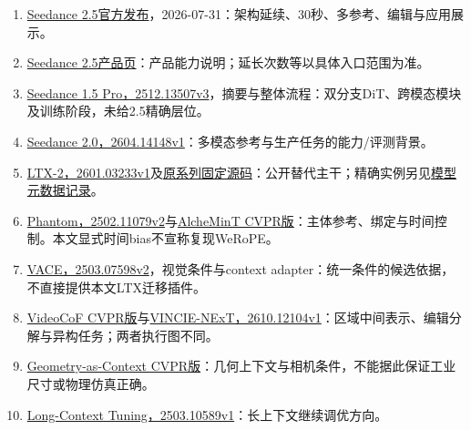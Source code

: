\begin{enumerate}
\def\labelenumi{\arabic{enumi}.}
\tightlist
\item
  \href{https://seed.bytedance.com/blog/one-take-creation-flexible-referencing-introducing-seedance-2-5}{Seedance 2.5官方发布}，2026-07-31：架构延续、30秒、多参考、编辑与应用展示。
\item
  \href{https://seed.bytedance.com/en/seedance2_5}{Seedance 2.5产品页}：产品能力说明；延长次数等以具体入口范围为准。
\item
  \href{https://arxiv.org/abs/2512.13507v3}{Seedance 1.5 Pro，2512.13507v3}，摘要与整体流程：双分支DiT、跨模态模块及训练阶段，未给2.5精确层位。
\item
  \href{https://arxiv.org/abs/2604.14148v1}{Seedance 2.0，2604.14148v1}：多模态参考与生产任务的能力/评测背景。
\item
  \href{https://arxiv.org/abs/2601.03233v1}{LTX-2，2601.03233v1}及\href{https://github.com/Lightricks/LTX-2/tree/bd92a5f408eb8c99f8c05e9fe2fcaaec8b56b638}{原系列固定源码}：公开替代主干；精确实例另见\href{https://github.com/foocker/multimodal-journey/blob/0f1b6bb86d609d75d8c2582063d85707d0180d39/research/2026-11-22-implementation-contracts/model-config-check.json}{模型元数据记录}。
\item
  \href{https://arxiv.org/abs/2502.11079v2}{Phantom，2502.11079v2}与\href{https://openaccess.thecvf.com/content/CVPR2026/html/Girish_AlcheMinT_Fine-grained_Temporal_Control_for_Multi-Reference_Consistent_Video_Generation_CVPR_2026_paper.html}{AlcheMinT CVPR版}：主体参考、绑定与时间控制。本文显式时间bias不宣称复现WeRoPE。
\item
  \href{https://arxiv.org/abs/2503.07598v2}{VACE，2503.07598v2}，视觉条件与context adapter：统一条件的候选依据，不直接提供本文LTX迁移插件。
\item
  \href{https://openaccess.thecvf.com/content/CVPR2026/html/Yang_VideoCoF_Unified_Video_Editing_with_Temporal_Reasoner_CVPR_2026_paper.html}{VideoCoF CVPR版}与\href{https://arxiv.org/abs/2610.12104v1}{VINCIE-NExT，2610.12104v1}：区域中间表示、编辑分解与异构任务；两者执行图不同。
\item
  \href{https://openaccess.thecvf.com/content/CVPR2026/html/Hu_Geometry-as-context_Modulating_Explicit_3D_in_Scene-consistent_Video_Generation_to_Geometry_CVPR_2026_paper.html}{Geometry-as-Context CVPR版}：几何上下文与相机条件，不能据此保证工业尺寸或物理仿真正确。
\item
  \href{https://arxiv.org/abs/2503.10589v1}{Long-Context Tuning，2503.10589v1}：长上下文继续调优方向。

\end{enumerate}
